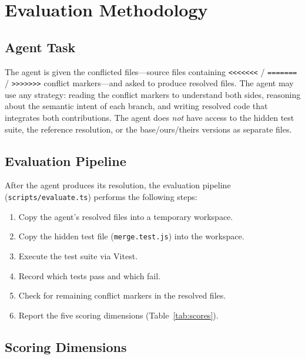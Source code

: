 \documentclass[11pt,letterpaper]{article}
\begin{document}
\section{Evaluation Methodology}
\label{sec:methodology}

\subsection{Agent Task}

The agent is given the conflicted files---source files containing \texttt{<{}<{}<{}<{}<{}<{}<} / \texttt{=======} / \texttt{>{}>{}>{}>{}>{}>{}>{}} conflict markers---and asked to produce resolved files. The agent may use any strategy: reading the conflict markers to understand both sides, reasoning about the semantic intent of each branch, and writing resolved code that integrates both contributions. The agent does \emph{not} have access to the hidden test suite, the reference resolution, or the base/ours/theirs versions as separate files.

\subsection{Evaluation Pipeline}

After the agent produces its resolution, the evaluation pipeline (\texttt{scripts/evaluate.ts}) performs the following steps:

\begin{enumerate}[leftmargin=2em]
\item Copy the agent's resolved files into a temporary workspace.
\item Copy the hidden test file (\texttt{merge.test.js}) into the workspace.
\item Execute the test suite via Vitest.
\item Record which tests pass and which fail.
\item Check for remaining conflict markers in the resolved files.
\item Report the five scoring dimensions (Table~\ref{tab:scores}).
\end{enumerate}

\subsection{Scoring Dimensions}
\end{document}
